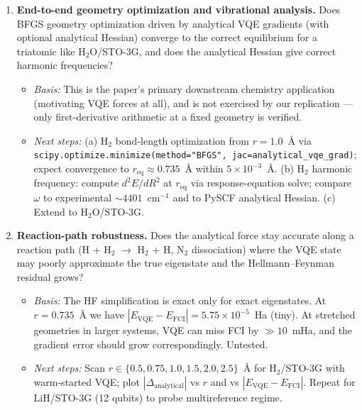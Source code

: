 \begin{enumerate}
\item \textbf{End-to-end geometry optimization and vibrational analysis.} Does BFGS geometry
optimization driven by analytical VQE gradients (with optional analytical Hessian) converge to the
correct equilibrium for a triatomic like H$_2$O/STO-3G, and does the analytical Hessian give
correct harmonic frequencies?
\begin{itemize}
\item \emph{Basis:} This is the paper's primary downstream chemistry application (motivating VQE
forces at all), and is not exercised by our replication --- only first-derivative arithmetic at a
fixed geometry is verified.
\item \emph{Next steps:} (a) H$_2$ bond-length optimization from $r=1.0$~\AA{} via
\texttt{scipy.optimize.minimize(method="BFGS", jac=analytical\_vqe\_grad)}; expect convergence to
$r_{\text{eq}}\approx 0.735$~\AA{} within $5\times10^{-3}$~\AA{}. (b) H$_2$ harmonic frequency:
compute $d^2E/dR^2$ at $r_{\text{eq}}$ via response-equation solve; compare $\omega$ to experimental
$\sim4401$~cm$^{-1}$ and to PySCF analytical Hessian. (c) Extend to H$_2$O/STO-3G.
\end{itemize}

\item \textbf{Reaction-path robustness.} Does the analytical force stay accurate along a reaction
path (H + H$_2$ $\to$ H$_2$ + H, N$_2$ dissociation) where the VQE state may poorly approximate the
true eigenstate and the Hellmann--Feynman residual grows?
\begin{itemize}
\item \emph{Basis:} The HF simplification is exact only for exact eigenstates. At $r=0.735$~\AA{}
we have $|E_{\text{VQE}}-E_{\text{FCI}}|=5.75\times10^{-5}$~Ha (tiny). At stretched geometries in
larger systems, VQE can miss FCI by $\gg 10$~mHa, and the gradient error should grow correspondingly.
Untested.
\item \emph{Next steps:} Scan $r\in\{0.5,0.75,1.0,1.5,2.0,2.5\}$~\AA{} for H$_2$/STO-3G with
warm-started VQE; plot $|\Delta_{\text{analytical}}|$ vs $r$ and vs $|E_{\text{VQE}}-E_{\text{FCI}}|$.
Repeat for LiH/STO-3G (12 qubits) to probe multireference regime.
\end{itemize}


\end{enumerate}

